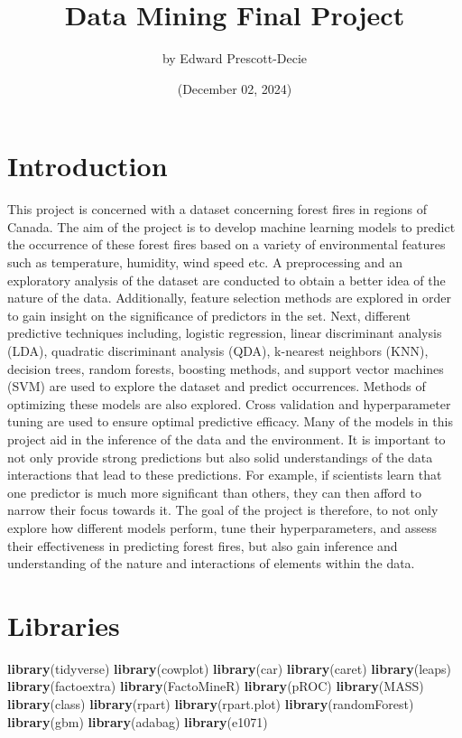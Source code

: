 \documentclass[
]{article}
\title{Data Mining Final Project}
\author{by Edward Prescott-Decie}
\date{(December 02, 2024)}
\newenvironment{Shaded}{\begin{snugshade}}{\end{snugshade}}
\newcommand{\FunctionTok}[1]{\textcolor[rgb]{0.13,0.29,0.53}{\textbf{#1}}}
\newcommand{\NormalTok}[1]{#1}
\begin{document}
\maketitle

{
\setcounter{tocdepth}{3}
\tableofcontents
}
\section{Introduction}\label{introduction}

This project is concerned with a dataset concerning forest fires in
regions of Canada. The aim of the project is to develop machine learning
models to predict the occurrence of these forest fires based on a
variety of environmental features such as temperature, humidity, wind
speed etc. A preprocessing and an exploratory analysis of the dataset
are conducted to obtain a better idea of the nature of the data.
Additionally, feature selection methods are explored in order to gain
insight on the significance of predictors in the set. Next, different
predictive techniques including, logistic regression, linear
discriminant analysis (LDA), quadratic discriminant analysis (QDA),
k-nearest neighbors (KNN), decision trees, random forests, boosting
methods, and support vector machines (SVM) are used to explore the
dataset and predict occurrences. Methods of optimizing these models are
also explored. Cross validation and hyperparameter tuning are used to
ensure optimal predictive efficacy. Many of the models in this project
aid in the inference of the data and the environment. It is important to
not only provide strong predictions but also solid understandings of the
data interactions that lead to these predictions. For example, if
scientists learn that one predictor is much more significant than
others, they can then afford to narrow their focus towards it. The goal
of the project is therefore, to not only explore how different models
perform, tune their hyperparameters, and assess their effectiveness in
predicting forest fires, but also gain inference and understanding of
the nature and interactions of elements within the data.

\section{Libraries}\label{libraries}

\begin{Shaded}
\begin{Highlighting}[]
\FunctionTok{library}\NormalTok{(tidyverse)}
\FunctionTok{library}\NormalTok{(cowplot)}
\FunctionTok{library}\NormalTok{(car)}
\FunctionTok{library}\NormalTok{(caret)}
\FunctionTok{library}\NormalTok{(leaps)}
\FunctionTok{library}\NormalTok{(factoextra)}
\FunctionTok{library}\NormalTok{(FactoMineR)}
\FunctionTok{library}\NormalTok{(pROC)}
\FunctionTok{library}\NormalTok{(MASS)}
\FunctionTok{library}\NormalTok{(class)}
\FunctionTok{library}\NormalTok{(rpart)}
\FunctionTok{library}\NormalTok{(rpart.plot)}
\FunctionTok{library}\NormalTok{(randomForest)}
\FunctionTok{library}\NormalTok{(gbm)}
\FunctionTok{library}\NormalTok{(adabag)}
\FunctionTok{library}\NormalTok{(e1071)}
\end{Highlighting}
\end{Shaded}
\end{document}

